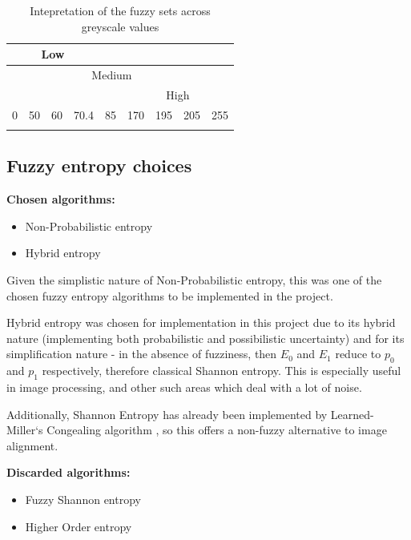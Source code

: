 \begin{table}
  \center
  \begin{tabular}{ |l|l|l|l|l|l|l|l|l| }
    \hline
    \multicolumn{4}{|c|}{Low} & \multicolumn{5}{|c|}{} \\
    \hline
    \multicolumn{2}{|c|}{} & \multicolumn{5}{|c|}{Medium} & \multicolumn{2}{|c|}{}  \\
    \hline
    \multicolumn{5}{|c|}{} & \multicolumn{4}{|c|}{High} \\
    \hline
    0 & 50 & 60 & 70.4 & 85 & 170 & 195 & 205 & 255 \\
    \hline
    \cellcolor[gray]{0} & \cellcolor[gray]{0.19} & \cellcolor[gray]{0.24} & \cellcolor[gray]{0.28} & \cellcolor[gray]{0.33} & \cellcolor[gray]{0.66} & \cellcolor[gray]{0.76} & \cellcolor[gray]{0.8} & \cellcolor[gray]{1} \\ \hline
  \end{tabular}
\caption{Intepretation of the fuzzy sets across greyscale values}
\label{table:values}
\end{table}

\subsection{Fuzzy entropy choices}

\textbf{Chosen algorithms:}
\begin{itemize}
  \item Non-Probabilistic entropy
  \item Hybrid entropy
\end{itemize}

Given the simplistic nature of Non-Probabilistic entropy, this was one of the chosen fuzzy entropy algorithms to be implemented in the project.

Hybrid entropy was chosen for implementation in this project due to its hybrid nature (implementing both probabilistic and possibilistic uncertainty) and for its simplification nature - in the absence of fuzziness, then $E_0$ and $E_1$ reduce to $p_0$ and $p_1$ respectively, therefore classical Shannon entropy. This is especially useful in image processing, and other such areas which deal with a lot of noise.

Additionally, Shannon Entropy has already been implemented by Learned-Miller`s Congealing algorithm \cite{joint-alignment}, so this offers a non-fuzzy alternative to image alignment.

\textbf{Discarded algorithms:}
\begin{itemize}
  \item Fuzzy Shannon entropy
  \item Higher Order entropy
\end{itemize}

